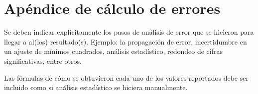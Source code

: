 \documentclass[a4paper, amsfonts, amssymb, amsmath, reprint, showkeys, nofootinbib, twoside]{revtex4-1}
\begin{document}


\nocite{Ejemplo}

\section*{Apéndice de cálculo de errores}

Se deben indicar explícitamente los pasos de análisis de error que se hicieron para llegar a al(los) resultado(s). Ejemplo: la propagación de error, incertidumbre en un ajuste de mínimos cuadrados, análisis estadístico, redondeo de cifras significativas, entre otros.

Las fórmulas de cómo se obtuvieron cada uno de los valores reportados debe ser incluido como si análisis estadístico se hiciera manualmente.
\end{document}
